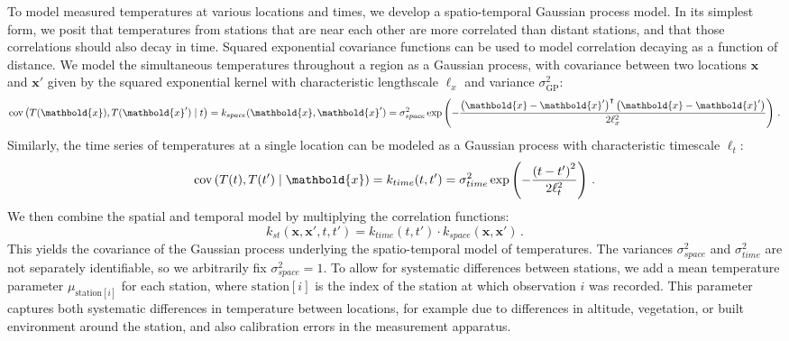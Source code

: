 \documentclass[letter]{article}
\newcommand{\genericdel}[3]{%
      \left#1#3\right#2
    }
\newcommand{\del}[1]{\genericdel(){#1}}
\newcommand{\sbr}[1]{\genericdel[]{#1}}
\DeclareMathOperator{\cov}{{cov}}
\newcommand{\station}[1]{\mathrm{station}\sbr{#1}}
\newcommand{\xvec}{\mathbold{x}}
\newcommand{\trans}{^{\intercal}}
\newcommand{\sigmaf}{\sigma_{\mathrm{GP}}}
\begin{document}
To model measured temperatures at various locations and times, we develop a spatio-temporal Gaussian process model.
In its simplest form, we posit that temperatures from stations that are near each other are more correlated than distant stations, and that those correlations should also decay in time.
Squared exponential covariance functions can be used to model correlation decaying as a function of distance.
We model the simultaneous temperatures throughout a region as a Gaussian process, with covariance between two locations \(\xvec\) and \(\xvec'\) given by the squared exponential kernel with characteristic lengthscale \(\ell_x\) and variance \(\sigmaf^2\):
\begin{equation}
    \cov\del{T(\xvec), T(\xvec') \mid t} = k_{space}(\xvec, \xvec') =  \sigma_{space}^2 \exp\del{-\frac{\del{\xvec-\xvec'}\trans\del{\xvec-\xvec'}}{2\ell_x^2}}\,.
    \label{eq:kspace}
\end{equation}
Similarly, the time series of temperatures at a single location can be modeled as a Gaussian process with characteristic timescale \(\ell_t\):
\begin{equation}
\cov\del{T(t), T(t') \mid \xvec} = k_{time}(t, t') = \sigma_{time}^2 \exp\del{-\frac{\del{t-t'}^2}{2\ell_t^2}}\,.
\end{equation}
We then combine the spatial and temporal model by multiplying the correlation functions:
\begin{equation}
k_{st}(\xvec,\xvec',t,t') = k_{time}(t,t') \cdot k_{space}(\xvec, \xvec')\,.
\end{equation}
This yields the covariance of the Gaussian process underlying the spatio-temporal model of temperatures.
The variances \(\sigma_{space}^2\) and \(\sigma_{time}^2\) are not separately identifiable, so we arbitrarily fix \(\sigma_{space}^2=1\).
To allow for systematic differences between stations, we add a mean temperature parameter \(\mu_{\station{i}}\) for each station, where $\station{i}$ is the index of the station at which observation $i$ was recorded.
This parameter captures both systematic differences in temperature between locations, for example due to differences in altitude, vegetation, or built environment around the station, and also calibration errors in the measurement apparatus.
\end{document}
